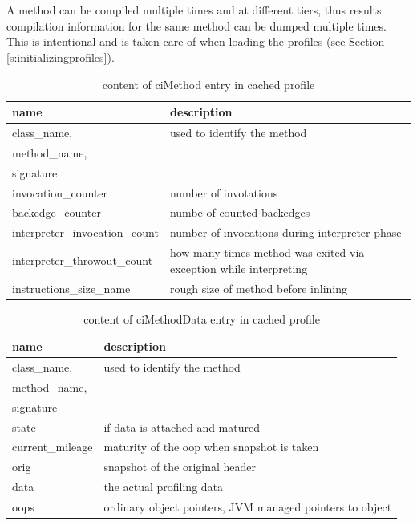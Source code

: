 \\\\
A method can be compiled multiple times and at different tiers, thus results compilation information for the same method can be dumped multiple times. This is intentional and is taken care of when loading the profiles (see Section \ref{s:initializingprofiles}).
\begin{table}[ht!]
  \caption{content of ciMethod entry in cached profile}
  \label{t:cimethod}
  \begin{center}
    \begin{tabular}{|p{5cm}|p{10.5cm}|} 
      \hline
       \textbf{name} & \textbf{description} \\ \hline\hline
       class\_name,& used to identify the method\\
       method\_name, & \\
       signature & \\ \hline
       invocation\_counter & number of invotations\\ \hline
       backedge\_counter & numbe of counted backedges\\ \hline
       interpreter\_invocation\_count & number of invocations during interpreter phase\\ \hline
       interpreter\_throwout\_count & how many times method was exited via exception while interpreting\\ \hline
       instructions\_size\_name & rough size of method before inlining\\ \hline
    \end{tabular}
  \end{center}
\end{table}
\begin{table}[ht!]
  \caption{content of ciMethodData entry in cached profile}
  \label{t:cimethoddata}
  \begin{center}
    \begin{tabular}{|p{5cm}|p{10.5cm}|} 
      \hline
       \textbf{name} & \textbf{description} \\ \hline\hline
       class\_name,& used to identify the method\\
       method\_name, & \\
       signature & \\ \hline
       state & if data is attached and matured\\ \hline
       current\_mileage & maturity of the oop when snapshot is taken\\ \hline
       orig &  snapshot of the original header\\ \hline
       data & the actual profiling data\\ \hline
       oops & ordinary object pointers, JVM managed pointers to object\\ \hline        
    \end{tabular}
  \end{center}
\end{table}
